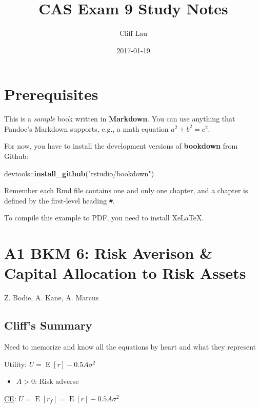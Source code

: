 \documentclass[]{book}
\title{CAS Exam 9 Study Notes}
\author{Cliff Lau}
\date{2017-01-19}
\newenvironment{Shaded}{\begin{snugshade}}{\end{snugshade}}
\newcommand{\KeywordTok}[1]{\textcolor[rgb]{0.13,0.29,0.53}{\textbf{{#1}}}}
\newcommand{\StringTok}[1]{\textcolor[rgb]{0.31,0.60,0.02}{{#1}}}
\newcommand{\NormalTok}[1]{{#1}}
\providecommand{\tightlist}{%
  \setlength{\itemsep}{0pt}\setlength{\parskip}{0pt}}
\theoremstyle{definition}
\theoremstyle{definition}
\theoremstyle{remark}
\begin{document}
\maketitle

{
\setcounter{tocdepth}{1}
\tableofcontents
}
\chapter{Prerequisites}\label{prerequisites}

This is a \emph{sample} book written in \textbf{Markdown}. You can use
anything that Pandoc's Markdown supports, e.g., a math equation
\(a^2 + b^2 = c^2\).

For now, you have to install the development versions of
\textbf{bookdown} from Github:

\begin{Shaded}
\begin{Highlighting}[]
\NormalTok{devtools::}\KeywordTok{install_github}\NormalTok{(}\StringTok{"rstudio/bookdown"}\NormalTok{)}
\end{Highlighting}
\end{Shaded}

Remember each Rmd file contains one and only one chapter, and a chapter
is defined by the first-level heading \texttt{\#}.

To compile this example to PDF, you need to install XeLaTeX.

\chapter{A1 BKM 6: Risk Averison \& Capital Allocation to Risk
Assets}\label{a1-bkm-6-risk-averison-capital-allocation-to-risk-assets}

Z. Bodie, A. Kane, A. Marcus

\section{Cliff's Summary}\label{cliffs-summary}

Need to memorize and know all the equations by heart and what they
represent

Utility: \(U = \operatorname{E}[r] - 0.5A\sigma^2\)

\begin{itemize}
\tightlist
\item
  \(A > 0\): Risk adverse
\end{itemize}

\protect\hyperlink{CE}{CE}:
\(U = \operatorname{E}[r_f] = \operatorname{E}[r] - 0.5A\sigma^2\)
\end{document}
